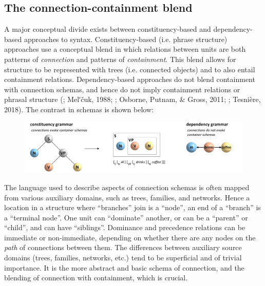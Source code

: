 \subsection{The connection-containment blend}

A major conceptual divide exists between constituency-based and dependency-based approaches to syntax. Constituency-based (i.e. phrase structure) approaches use a conceptual blend in which relations between units are both patterns of \textit{connection} and patterns of \textit{containment}. This blend allows for structure to be represented with trees (i.e. connected objects) and to also entail containment relations. Dependency-based approaches do not blend containment with connection schemas, and hence do not imply containment relations or phrasal structure (\citealt{Hays1964}; Melʹčuk, 1988; \citealt{Osborne2006}; Osborne, Putnam, \& Gross, 2011; \citealt{Percival1990}; Tesnière, 2018). The contrast in schemas is shown below: 

  
\begin{figure}
\includegraphics[width=\textwidth]{figures/Tilsen-img34.png}
\caption{\missingcaption}
\label{fig:}
\end{figure}
 

  The language used to describe aspects of connection schemas is often mapped from various auxiliary domains, such as trees, families, and networks. Hence a location in a structure where “branches” join is a “node”, an end of a “branch” is a “terminal node”. One unit can “dominate” another, or can be a “parent” or “child”, and can have “siblings”. Dominance and precedence relations can be immediate or non-immediate, depending on whether there are any nodes on the \textit{path} of connections between them. The differences between auxiliary source domains (trees, families, networks, etc.) tend to be superficial and of trivial importance. It is the more abstract and basic schema of connection, and the blending of connection with containment, which is crucial.   

